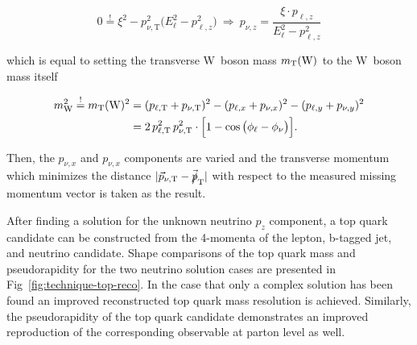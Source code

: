 \begin{equation}
0\overset{!}{=}\xi^2-p_{\nu,\mathrm{T}}^2\big(E_{\ell}^2-p_{\ell,z}^2\big)~
\Rightarrow~ p_{\nu,z}=\frac{\xi\cdot p_{\ell,z}}{E_{\ell}^{2}-p_{\ell,z}^{2}}
\end{equation}

which is equal to setting the transverse W~boson mass $m_{\mathrm{T}}(\mathrm{W})$ to the W~boson mass itself

\begin{align}
m_\mathrm{W}^2\overset{!}{=}m_{\mathrm{T}}(\mathrm{W})^2&=(p_{\ell,\mathrm{T}}+p_{\nu,\mathrm{T}})^2-(p_{\ell,x}+p_{\nu,x})^{2}-(p_{\ell,y}+p_{\nu,y})^{2}\\
&=2\,p_{\ell,\mathrm{T}}^2\,p_{\nu,\mathrm{T}}^2\cdot\Big[1-\cos\big(\phi_\ell-\phi_\nu\big)\Big].
\end{align}

Then, the $p_{\nu,x}$ and $p_{\nu,x}$ components are varied and the transverse momentum which minimizes the distance $|\vec{p}_{\nu,\mathrm{T}}-\vec{\slashed{p}}_\mathrm{T}|$ with respect to the measured missing momentum vector is taken as the result. 

After finding a solution for the unknown neutrino $p_{z}$ component, a top quark candidate can be constructed from the 4-momenta of the lepton, b-tagged jet, and neutrino candidate. Shape comparisons of the top quark mass and pseudorapidity for the two neutrino solution cases are presented in Fig~\ref{fig:technique-top-reco}. In the case that only a complex solution has been found an improved reconstructed top quark mass resolution is achieved. Similarly, the pseudorapidity of the top quark candidate demonstrates an improved reproduction of the corresponding observable at parton level as well.


